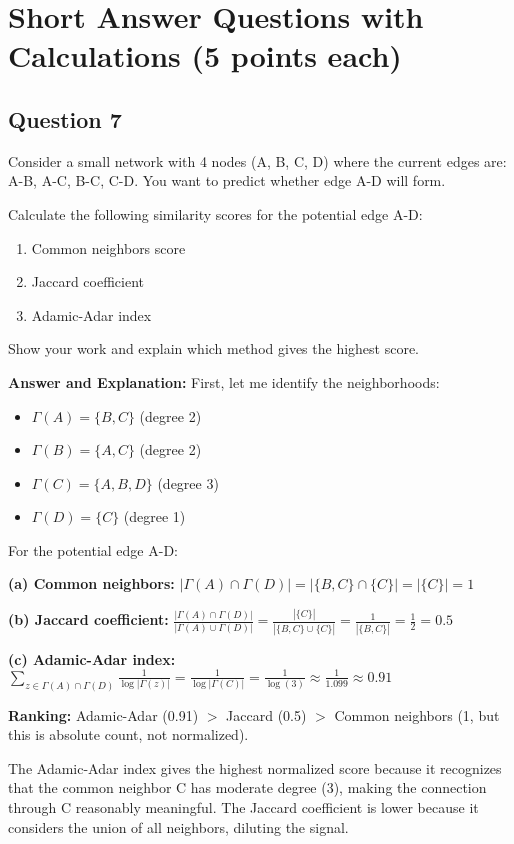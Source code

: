 \documentclass[11pt]{article}
\newenvironment{answer}{\color{answercolor}\begin{framed}\textbf{Answer and Explanation:}}{\end{framed}}
\begin{document}
\section{Short Answer Questions with Calculations (5 points each)}

\subsection{Question 7}
Consider a small network with 4 nodes (A, B, C, D) where the current edges are: A-B, A-C, B-C, C-D. You want to predict whether edge A-D will form.

Calculate the following similarity scores for the potential edge A-D:
\begin{enumerate}[label=(\alph*)]
\item Common neighbors score
\item Jaccard coefficient  
\item Adamic-Adar index
\end{enumerate}

Show your work and explain which method gives the highest score.

\begin{answer}
First, let me identify the neighborhoods:
\begin{itemize}
\item $\Gamma(A) = \{B, C\}$ (degree 2)
\item $\Gamma(B) = \{A, C\}$ (degree 2)  
\item $\Gamma(C) = \{A, B, D\}$ (degree 3)
\item $\Gamma(D) = \{C\}$ (degree 1)
\end{itemize}

For the potential edge A-D:

\textbf{(a) Common neighbors:} $|\Gamma(A) \cap \Gamma(D)| = |\{B,C\} \cap \{C\}| = |\{C\}| = 1$

\textbf{(b) Jaccard coefficient:} $\frac{|\Gamma(A) \cap \Gamma(D)|}{|\Gamma(A) \cup \Gamma(D)|} = \frac{|\{C\}|}{|\{B,C\} \cup \{C\}|} = \frac{1}{|\{B,C\}|} = \frac{1}{2} = 0.5$

\textbf{(c) Adamic-Adar index:} $\sum_{z \in \Gamma(A) \cap \Gamma(D)} \frac{1}{\log|\Gamma(z)|} = \frac{1}{\log|\Gamma(C)|} = \frac{1}{\log(3)} \approx \frac{1}{1.099} \approx 0.91$

\textbf{Ranking:} Adamic-Adar (0.91) $>$ Jaccard (0.5) $>$ Common neighbors (1, but this is absolute count, not normalized).

The Adamic-Adar index gives the highest normalized score because it recognizes that the common neighbor C has moderate degree (3), making the connection through C reasonably meaningful. The Jaccard coefficient is lower because it considers the union of all neighbors, diluting the signal.
\end{answer}
\end{document}
